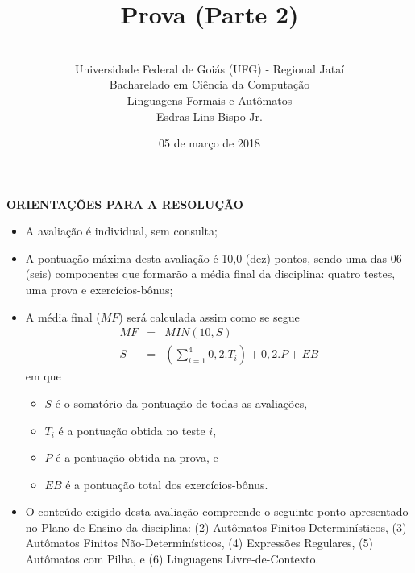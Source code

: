 \documentclass[12pt,a4paper,oneside]{article}
\author{\\Universidade Federal de Goiás (UFG) - Regional  Jataí\\Bacharelado em Ciência da Computação \\Linguagens Formais e Autômatos \\Esdras Lins Bispo Jr.}
\date{05 de março de 2018}
\title{\sc \huge Prova (Parte 2)}
\begin{document}
\maketitle

{\bf ORIENTAÇÕES PARA A RESOLUÇÃO}

\small
 
\begin{itemize}
	\item A avaliação é individual, sem consulta;
	\item A pontuação máxima desta avaliação é 10,0 (dez) pontos, sendo uma das 06 (seis) componentes que formarão a média final da disciplina: quatro testes, uma prova e exercícios-bônus;
	\item A média final ($MF$) será calculada assim como se segue
	\begin{eqnarray}
		MF & = & MIN(10, S) \nonumber \\
		S & = & (\sum_{i=1}^{4} 0,2.T_i ) + 0,2.P  + EB\nonumber
	\end{eqnarray}
	em que 
	\begin{itemize}
		\item $S$ é o somatório da pontuação de todas as avaliações,
		\item $T_i$ é a pontuação obtida no teste $i$,
		\item $P$ é a pontuação obtida na prova, e
		\item $EB$ é a pontuação total dos exercícios-bônus.
	\end{itemize}
	\item O conteúdo exigido desta avaliação compreende o seguinte ponto apresentado no Plano de Ensino da disciplina: (2) Autômatos Finitos Determinísticos, (3) Autômatos Finitos Não-Determinísticos, (4) Expressões Regulares, (5) Autômatos com Pilha, e (6) Linguagens Livre-de-Contexto.
\end{itemize}

\begin{center}
\end{center}

\newpage
\end{document}
